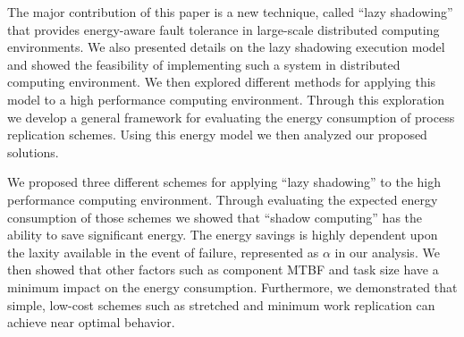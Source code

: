 
The major contribution of this paper is a new technique, called
``lazy shadowing'' that provides energy-aware fault tolerance in
large-scale distributed computing environments. We also presented
details on the lazy shadowing execution model and showed the
feasibility of implementing such a system in distributed computing
environment. We then explored different methods for applying this model
to a high performance computing environment. Through this exploration
we develop a general framework for evaluating the energy consumption
of process replication schemes. Using this energy model we then
analyzed our proposed solutions.

We proposed three different schemes for applying ``lazy shadowing''
to the high performance computing environment. Through evaluating the
expected energy consumption of those schemes we showed that ``shadow
computing'' has the ability to save significant energy. The energy
savings is highly dependent upon the laxity available in the event of
failure, represented as $\alpha$ in our analysis. We then showed that
other factors such as component MTBF and task size have a minimum
impact on the energy consumption. Furthermore, we demonstrated that
simple, low-cost schemes such as stretched and minimum work
replication can achieve near optimal behavior.
